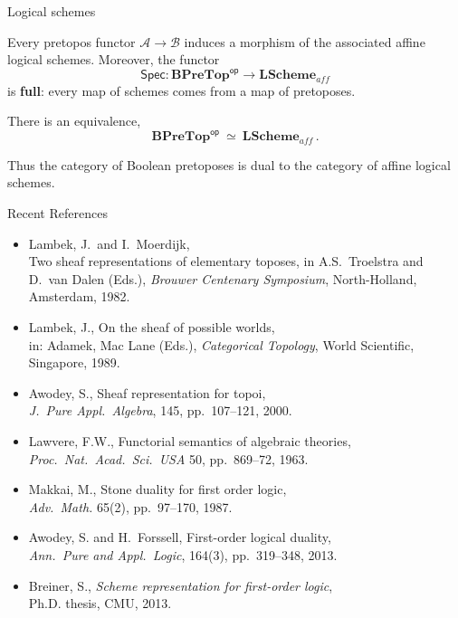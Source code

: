 \documentclass{beamer}
\newcommand{\myemph}[1]{\textbf{#1}}    %
\begin{document}
\begin{frame}{Logical schemes}

\begin{theorem}[A.-Breiner 2012]
Every pretopos functor $\mathcal{A} \to \mathcal{B}$ induces a morphism of the associated affine logical schemes.  Moreover, the  functor
\[
\mathsf{Spec} : \mathbf{BPreTop}^{\mathsf{op}} \longrightarrow \mathbf{LScheme}_{aff}
\]
is \myemph{full}: every map of schemes comes from a map of pretoposes.
\end{theorem}

\begin{corollary}
There is an equivalence,
\[
\mathbf{BPreTop}^{\mathsf{op}} \ \simeq\ \mathbf{LScheme}_{aff}\,.
\]
\end{corollary}

Thus the category of Boolean pretoposes is dual to the category of affine logical schemes.


\end{frame}
\begin{frame}{Recent References}

\begin{itemize}
\item Lambek, J.\ and I.~Moerdijk,\\
 Two sheaf representations of elementary toposes, in 
 A.S.\ Troelstra and D.\ van Dalen (Eds.), \emph{Brouwer Centenary Symposium}, North-Holland, Amsterdam, 1982.
\item Lambek, J., On the sheaf of possible worlds,\\
 in: Adamek, Mac Lane (Eds.), \emph{Categorical Topology}, World Scientific, Singapore, 1989.
\item Awodey, S., Sheaf representation for topoi,\\
 \emph{J.\ Pure Appl.\ Algebra}, 145, pp.~107--121, 2000.
\item Lawvere, F.W., Functorial semantics of algebraic theories,  \emph{Proc.\ Nat.\ Acad.\ Sci.\ USA} 50, pp.~869--72, 1963.
\item Makkai, M., Stone duality for first order logic,\\
 \emph{Adv.\ Math.} 65(2), pp.~97--170,  1987.
\item Awodey, S. and H.~Forssell, First-order logical duality,\\
 \emph{Ann.\ Pure and Appl.\ Logic}, 164(3), pp.~319--348, 2013.
\item Breiner, S., \emph{Scheme representation for first-order logic},\\
 Ph.D. thesis, CMU, 2013.
\end{itemize}

\end{frame}








\end{document}
